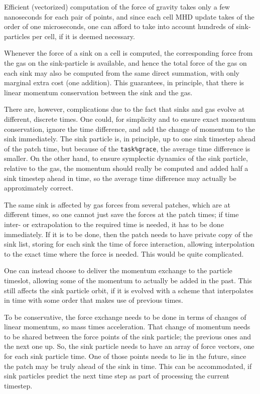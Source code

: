 \documentclass[paper=a4,fontsize=11pt]{scrartcl}
\numberwithin{equation}{section}		%
\numberwithin{figure}{section}			%
\numberwithin{table}{section}				%
\begin{document}
Efficient (vectorized) computation of the force of gravity takes only a few nanoseconds for each pair of points, and since each cell MHD update takes of the order of one microseconds, one can afford to take into account hundreds of sink-particles per cell, if it is deemed necessary.

Whenever the force of a sink on a cell is computed, the corresponding force from the gas on the sink-particle is available, and hence the total force of the gas on each sink may also be computed from the same direct summation, with only marginal extra cost (one addition).   This guarantees, in principle, that there is linear momentum conservation between the sink and the gas.  

There are, however, complications due to the fact that sinks and gas evolve at different, discrete times.  One could, for simplicity and to ensure exact momentum conservation, ignore the time difference, and add the change of momentum to the sink immediately.  The sink particle is, in principle, up to one sink timestep ahead of the patch time, but because of the \verb|task%grace|, the average time difference is smaller.  On the other hand, to ensure symplectic dynamics of the sink particle, relative to the gas, the momentum should really be computed and added half a sink timestep ahead in time, so the average time difference may actually be approximately correct.

The same sink is affected by gas forces from several patches, which are at different times, so one cannot just save the forces at the patch times; if time inter- or extrapolation to the required time is needed, it has to be done immediately.  If it is to be done, then the patch needs to have private copy of the sink list, storing for each sink the time of force interaction, allowing interpolation to the exact time where the force is needed.   This would be quite complicated.

One can instead choose to deliver the momentum exchange to the particle timeslot, allowing some of the momentum to actually be added in the past.  This still affects the sink particle orbit, if it is evolved with a scheme that interpolates in time with some order that makes use of previous times.

To be conservative, the force exchange needs to be done in terms of changes of linear momentum, so mass times acceleration.  That change of momentum needs to be shared between the force points of the sink particle; the previous ones and the next one up.  So, the sink particle needs to have an array of force vectors, one for each sink particle time.  One of those points needs to lie in the future, since the patch may be truly ahead of the sink in time.  This can be accommodated, if sink particles predict the next time step as part of processing the current timestep.
\end{document}
